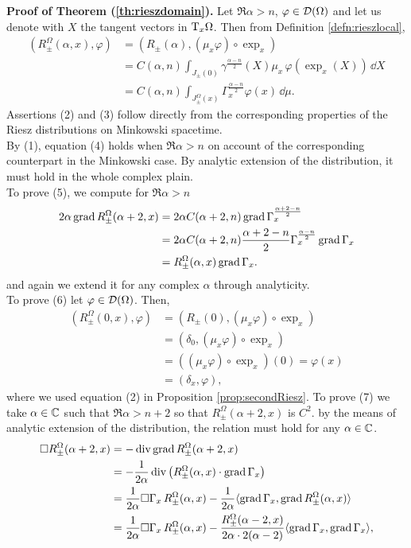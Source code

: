 \textbf{Proof of Theorem (\ref{th:rieszdomain}).} Let $\Re\alpha>n$, $\varphi\in\mathcal{D}(\Omega)$ and let us denote with $X$ the tangent vectors in $\mathrm{T}_x\Omega$. Then from Definition \ref{defn:rieszlocal},
\[ \begin{aligned}
\left(R_\pm^\Omega(\alpha,x),\varphi\right)&=\left(R_\pm(\alpha),(\mu_x\varphi)\circ\exp_x\right)\\
&=C(\alpha,n)\int_{J_\pm(0)}\gamma^{\frac{\alpha-n}{2}}(X)\mu_x\,\varphi(\exp_x(X))\,\dd X\\
&=C(\alpha,n)\int_{J_\pm^\Omega(x)}\Gamma_x^{\frac{\alpha-n}{2}}\varphi(x)\,\dd\mu.
\end{aligned}		\]
Assertions (2) and (3) follow directly from the corresponding properties of the Riesz distributions on Minkowski spacetime.\\
By (1), equation (4) holds when $\Re\alpha>n$ on account of the corresponding counterpart in the Minkowski case. By analytic extension of the distribution, it must hold in the whole complex plain.\\
To prove (5), we compute for $\Re\alpha>n$
\[	\begin{aligned}
2\alpha\operatorname{grad} R_\pm^\Omega(\alpha+2,x)&=2\alpha C(\alpha+2,n)\operatorname{grad}\Gamma_x^{\frac{\alpha+2-n}{2}}\\
&=2\alpha C(\alpha+2,n)\frac{\alpha+2-n}{2}\Gamma_x^{\frac{\alpha-n}{2}}\operatorname{grad}\Gamma_x\\
&=R_\pm^\Omega(\alpha,x)\operatorname{grad}\Gamma_x.
\end{aligned}		\]
and again we extend it for any complex $\alpha$ through analyticity.\\
To prove (6) let $\varphi\in\mathcal{D}(\Omega)$. Then,
\[	\begin{aligned}
\left(R_\pm^\Omega(0,x),\varphi\right)&=\left(R_\pm(0),(\mu_x\varphi)\circ\exp_x\right)\\
&=\left(\delta_0,(\mu_x\varphi)\circ\exp_x\right)\\
&=\left((\mu_x\varphi)\circ\exp_x\right)(0)=\varphi(x)\\
&=\left(\delta_x,\varphi\right),
\end{aligned}	\]
where we used equation (2) in Proposition \ref{prop:secondRiesz}.
To prove (7) we take $\alpha\in{\mathbb C}$ such that $\Re\alpha>n+2$ so that $R_\pm^\Omega(\alpha+2,x)$ is $C^2$. by the means of analytic extension of the distribution, the relation must hold for any $\alpha\in{\mathbb C}$.
\[	\begin{aligned}
\Box R_\pm^\Omega(\alpha+2,x)&=-\operatorname{div}\operatorname{grad} R_\pm^\Omega(\alpha+2,x)\\
&=-\frac{1}{2\alpha}\operatorname{div}\left(R_\pm^\Omega(\alpha,x)\cdot\operatorname{grad}\Gamma_x\right)\\
&=\frac{1}{2\alpha}\Box\Gamma_x\, R_\pm^\Omega(\alpha,x)-\frac{1}{2\alpha}\langle\operatorname{grad}\Gamma_x,\operatorname{grad} R_\pm^\Omega(\alpha,x)\rangle\\
&=\frac{1}{2\alpha}\Box\Gamma_x\, R_\pm^\Omega(\alpha,x)-\frac{R_\pm^\Omega(\alpha-2,x)}{2\alpha\cdot 2(\alpha-2)}\langle\operatorname{grad}\Gamma_x,\operatorname{grad} \Gamma_x\rangle,\\
\end{aligned}		\]

